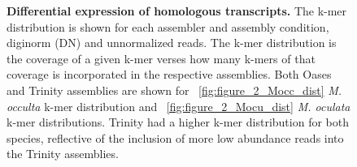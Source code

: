 \begin{figure}
{	}
	\caption{\textbf{Differential expression of homologous transcripts.} The k-mer distribution is shown for each assembler and assembly condition, diginorm (DN) and unnormalized reads. The k-mer distribution is the coverage of a given k-mer verses how many k-mers of that coverage is incorporated in the respective assemblies. Both Oases and Trinity assemblies are shown for ~\ref{fig:figure_2_Mocc_dist} \textit{M. occulta} k-mer distribution and  ~\ref{fig:figure_2_Mocu_dist} \textit{M. oculata} k-mer distributions. Trinity had a higher k-mer distribution for both species, reflective of the inclusion of more low abundance reads into the Trinity assemblies.}
	\label{fig:de_plots}
\end{figure}
